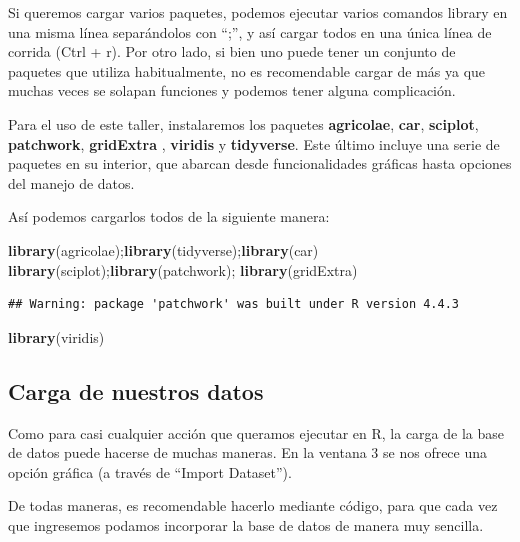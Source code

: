 \documentclass[
]{article}
\newenvironment{Shaded}{\begin{snugshade}}{\end{snugshade}}
\newcommand{\FunctionTok}[1]{\textcolor[rgb]{0.13,0.29,0.53}{\textbf{#1}}}
\newcommand{\NormalTok}[1]{#1}
\begin{document}
Si queremos cargar varios paquetes, podemos ejecutar varios comandos
library en una misma línea separándolos con ``;'', y así cargar todos en
una única línea de corrida (Ctrl + r). Por otro lado, si bien uno puede
tener un conjunto de paquetes que utiliza habitualmente, no es
recomendable cargar de más ya que muchas veces se solapan funciones y
podemos tener alguna complicación.

Para el uso de este taller, instalaremos los paquetes
\textbf{agricolae}, \textbf{car}, \textbf{sciplot}, \textbf{patchwork},
\textbf{gridExtra} , \textbf{viridis} y \textbf{tidyverse}. Este último
incluye una serie de paquetes en su interior, que abarcan desde
funcionalidades gráficas hasta opciones del manejo de datos.

Así podemos cargarlos todos de la siguiente manera:

\begin{Shaded}
\begin{Highlighting}[]
\FunctionTok{library}\NormalTok{(agricolae);}\FunctionTok{library}\NormalTok{(tidyverse);}\FunctionTok{library}\NormalTok{(car)}
\FunctionTok{library}\NormalTok{(sciplot);}\FunctionTok{library}\NormalTok{(patchwork); }\FunctionTok{library}\NormalTok{(gridExtra)}
\end{Highlighting}
\end{Shaded}

\begin{verbatim}
## Warning: package 'patchwork' was built under R version 4.4.3
\end{verbatim}

\begin{Shaded}
\begin{Highlighting}[]
\FunctionTok{library}\NormalTok{(viridis)}
\end{Highlighting}
\end{Shaded}

\subsection{Carga de nuestros datos}\label{carga-de-nuestros-datos}

Como para casi cualquier acción que queramos ejecutar en R, la carga de
la base de datos puede hacerse de muchas maneras. En la ventana 3 se nos
ofrece una opción gráfica (a través de ``Import Dataset'').

De todas maneras, es recomendable hacerlo mediante código, para que cada
vez que ingresemos podamos incorporar la base de datos de manera muy
sencilla.
\end{document}
